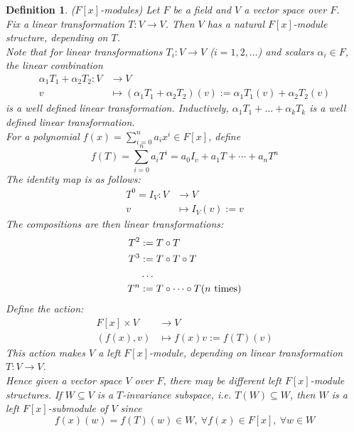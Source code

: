\documentclass[a4paper,8pt]{article}
\newcommand{\hlt}[1]{\textit{{\color{blue}#1}}}
\theoremstyle{theorem}
\newtheorem{definition}[theorem]{Definition}
\begin{document}
\begin{definition}
\hlt{($F[x]$-modules)} Let $F$ be a field and $V$ a vector space over $F$.\\
Fix a linear transformation $T: V \rightarrow V$. Then $V$ has a natural $F[x]$-module structure, depending on $T$.\\
Note that for linear transformations $T_i: V \rightarrow V$ ($i = 1, 2, \ldots$) and scalars $\alpha_i \in F$, the \hlt{linear combination}
\begin{align}
\alpha_1 T_1 + \alpha_2 T_2 : V &\rightarrow V \nonumber \\
v &\mapsto (\alpha_1 T_1 + \alpha_2 T_2)(v) := \alpha_1 T_1 (v) + \alpha_2 T_2 (v) \nonumber
\end{align}
is a well defined linear transformation. Inductively, $\alpha_1 T_1 + \ldots + \alpha_k T_k$ is a well defined linear transformation.\\
For a polynomial $f(x) = \sum_{i=0}^n a_i x^i \in F[x]$, define
\begin{equation}
f(T) = \sum_{i=0}^n a_i T^i = a_0 I_v + a_1 T + \cdots + a_n T^n \nonumber
\end{equation}
The \hlt{identity map} is as follows:
\begin{align}
T^0 = I_V: V &\rightarrow V \nonumber \\
v &\mapsto I_V(v) := v \nonumber
\end{align}
The compositions are then linear transformations: 
\begin{align}
T^2 &:= T \circ T \nonumber \\
T^3 &:= T \circ T \circ T \nonumber \\
&\ldots \nonumber \\
T^n &:= T \circ \cdots \circ T (n \ \textnormal{times}) \nonumber
\end{align}
Define the action:
\begin{align}
F[x] \times V &\rightarrow V \nonumber \\
(f(x), v) &\mapsto f(x)v := f(T)(v) \nonumber
\end{align}
This action makes $V$ a left $F[x]$-module, depending on linear transformation $T:V \rightarrow V$.\\
Hence given a vector space $V$ over $F$, there may be different left $F[x]$-module structures.
If $W \subseteq V$ is a \hlt{$T$-invariance subspace}, i.e. $T(W) \subseteq W$, then $W$ is a left $F[x]$-submodule of $V$ since
\begin{equation}
f(x)(w) = f(T)(w) \in W, \ \forall f(x) \in F[x], \ \forall w \in W \nonumber
\end{equation}
\end{definition}
\end{document}
